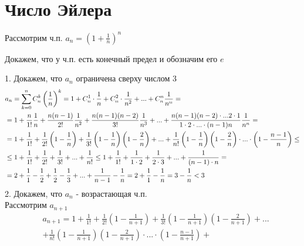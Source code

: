 \section{Число Эйлера}

{
Рассмотрим ч.п. $ a_n = (1 + \frac{1}{n})^n $

Докажем, что у ч.п. есть конечный предел и обозначим его $ e $

\begin{mcproof}
    1. Докажем, что $ a_n $ ограничена сверху числом 3
\begin{equation*}
\begin{split}
    & a_n = \sum_{k = 0}^{n} \cmb n k \left(\frac{1}{n}\right)^k = 
        1 + \cmb n 1 \cdot \frac{1}{n} + \cmb n 2 \cdot \frac{1}{n^2} + ... + \cmb n n \frac{1}{n^n} = \\
    & = 1
        + \frac{n}{1!} \frac{1}{n}
        + \frac{n(n-1)}{2!} \frac{1}{n^2}
        + \frac{n(n-1)(n-2)}{3!} \frac{1}{n^3}
        + ...
        + \frac{n (n - 1) (n - 2) \cdot ... 2 \cdot 1}{1 \cdot 2 \cdot ... \cdot (n - 1) n} \frac{1}{n^n} = \\
    & = 1 + \frac{1}{1!}
        + \frac{1}{2!} \left(1 - \frac{1}{n}\right)
        + \frac{1}{3!} \left(1 - \frac{1}{n}\right) \left(1 - \frac{2}{n}\right)
        + ...
        + \frac{1}{n!} \left(1 - \frac{1}{n}\right) \left(1 - \frac{2}{n}\right) \cdot ... \cdot \left(1 - \frac{n - 1}{n}\right) \le \\
    & \le 1 + \frac{1}{1!} + \frac{1}{2!} + \frac{1}{3!} + ... + \frac{1}{n!}
        \le 1 + \frac{1}{1!} + \frac{1}{1 \cdot 2} + \frac{1}{2 \cdot 3} + ... + \frac{1}{(n - 1) \cdot n} = \\
    & = 2 + \frac{1}{1} - \frac{1}{2} + \frac{1}{2} - \frac{1}{3} + ... + \frac{1}{n - 1} - \frac{1}{n}
        = 2 + \frac{1}{1} - \frac{1}{n} = 3 - \frac{1}{n} < 3 \\
\end{split}
\end{equation*}
    2. Докажем, что $ a_n $ - возрастающая ч.п. \\
    Рассмотрим $ a_{n + 1} $
\begin{equation*}
\begin{split}
    & a_{n + 1} =
        1 + \frac{1}{1!}
        + \frac{1}{2!} \left(1 - \frac{1}{n + 1}\right)
        + \frac{1}{3!} \left(1 - \frac{1}{n + 1}\right) \left(1 - \frac{2}{n + 1}\right)
        + ... \\
    & + \frac{1}{n!} \left(1 - \frac{1}{n + 1}\right) \left(1 - \frac{2}{n + 1}\right) \cdot ... \cdot \left(1 - \frac{n - 1}{n + 1}\right) + \\

\end{split}
\end{equation*}
\end{mcproof}}
